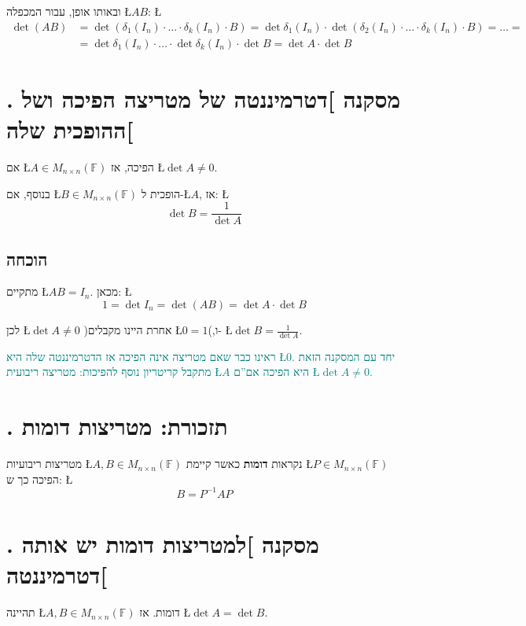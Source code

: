 \documentclass[english,hebrew]{article}
\begin{document}
ובאותו אופן, עבור המכפלה \L{$AB$}: \L{%
\begin{align*}
\det(AB) & =\det\left(\delta_{1}(I_{n})\cdot\dots\cdot\delta_{k}(I_{n})\cdot B\right)=\det\delta_{1}(I_{n})\cdot\det\left(\delta_{2}(I_{n})\cdot\dots\cdot\delta_{k}(I_{n})\cdot B\right)=\dots=\\
 & =\det\delta_{1}(I_{n})\cdot\dots\cdot\det\delta_{k}(I_{n})\cdot\det B=\det A\cdot\det B
\end{align*}
}%

\section{{\endL}. מסקנה {]}דטרמיננטה של מטריצה הפיכה ושל ההופכית
שלה{[}}

אם \L{$A\in M_{n\times n}(\mathbb{F})$} הפיכה, אז \L{$\det A\neq0$}.

בנוסף, אם \L{$B\in M_{n\times n}(\mathbb{F})$} הופכית ל-\L{$A$},
אז: \L{%
\[
\det B=\frac{1}{\det A}
\]
}%

\subsection{הוכחה}

מתקיים \L{$AB=I_{n}$}. מכאן: \L{%
\[
1=\det I_{n}=\det(AB)=\det A\cdot\det B
\]
}%

לכן \L{$\det A\neq0$} )אחרת היינו מקבלים \L{$0=1$}(,ו- \L{$\det B=\frac{1}{\det A}$}.

\textcolor{teal}{ראינו כבר שאם מטריצה אינה הפיכה אז הדטרמיננטה שלה
היא \L{$0$}. יחד עם המסקנה הזאת מתקבל קריטריון נוסף להפיכות: מטריצה
ריבועית \L{$A$} היא הפיכה אם\textquotedblright ם \L{$\det A\neq0$}.}

\section{{\endL}. תזכורת: מטריצות דומות}

מטריצות ריבועיות \L{$A,B\in M_{n\times n}(\mathbb{F})$} נקראות \textbf{דומות}
כאשר קיימת \L{$P\in M_{n\times n}(\mathbb{F})$} הפיכה כך ש: \L{%
\[
B=P^{-1}AP
\]
}%

\section{{\endL}. מסקנה {]}למטריצות דומות יש אותה דטרמיננטה{[}}

תהיינה \L{$A,B\in M_{n\times n}(\mathbb{F})$} דומות. אז \L{$\det A=\det B$}.
\end{document}

